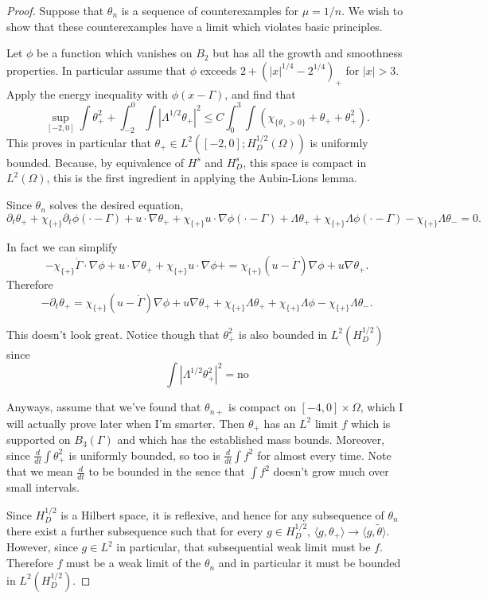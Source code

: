 \documentclass[11pt]{amsart}
\theoremstyle{remark}
\theoremstyle{definition}
\newcommand{\chevron}[1]{\langle #1 \rangle}
\newcommand{\paren}[1]{\left( #1 \right)}
\newcommand{\abs}[1]{\left\lvert #1 \right\rvert}
\newcommand{\del}{\partial}
\newcommand{\grad}{\nabla}
\newcommand{\ddt}{\frac{d}{dt}}
\newcommand{\indic}[1]{\chi_{\{#1\}}}
\begin{document}
\begin{proof}
Suppose that $\theta_n$ is a sequence of counterexamples for $\mu = 1/n$.  We wish to show that these counterexamples have a limit which violates basic principles.  

Let $\phi$ be a function which vanishes on $B_2$ but has all the growth and smoothness properties.  In particular assume that $\phi$ exceeds $2 + \paren{|x|^{1/4}-2^{1/4}}_+$ for $|x|>3$.  Apply the energy inequality with $\phi(x-\Gamma)$, and find that
\[ \sup_{[-2,0]} \int \theta_+^2 + \int_{-2}^0 \int \abs{\Lambda^{1/2}\theta_+}^2 \leq C \int_0^3 \int \paren{\indic{\theta_+>0} + \theta_+ + \theta_+^2}. \]
This proves in particular that $\theta_+ \in L^2([-2,0]; H_D^{1/2}(\Omega))$ is uniformly bounded.  Because, by equivalence of $H^s$ and $H^s_D$, this space is compact in $L^2(\Omega)$, this is the first ingredient in applying the Aubin-Lions lemma.  

Since $\theta_n$ solves the desired equation, 
\[ \del_t \theta_+ + \indic{+}\del_t \phi(\cdot-\Gamma) + u\cdot\grad\theta_+ + \indic{+}u\cdot\grad\phi(\cdot-\Gamma) + \Lambda \theta_+ + \indic{+} \Lambda\phi(\cdot-\Gamma) - \indic{+}\Lambda\theta_- = 0. \]

In fact we can simplify
\[ -\indic{+} \dot{\Gamma} \cdot\grad\phi + u\cdot\grad\theta_+ + \indic{+} u\cdot\grad\phi + = \indic{+} (u - \dot{\Gamma})\grad\phi + u\grad\theta_+. \]
Therefore
\[ -\del_t\theta_+ = \indic{+} (u - \dot{\Gamma})\grad\phi + u\grad\theta_+ + \indic{+}\Lambda \theta_+ + \indic{+}\Lambda\phi - \indic{+}\Lambda \theta_-. \]

This doesn't look great.  Notice though that $\theta_+^2$ is also bounded in $L^2(H_D^{1/2})$ since
\[ \int \abs{\Lambda^{1/2} \theta_+^2}^2 = \textrm{no} \]

Anyways, assume that we've found that $\theta_{n+}$ is compact on $[-4,0]\times\Omega$, which I will actually prove later when I'm smarter.  Then $\theta_+$ has an $L^2$ limit $f$ which is supported on $B_3(\Gamma)$ and which has the established mass bounds.  Moreover, since $\ddt \int \theta_+^2$ is uniformly bounded, so too is $\ddt \int f^2$ for almost every time.  Note that we mean $\ddt$ to be bounded in the sence that $\int f^2$ doesn't grow much over small intervals.  

Since $H_D^{1/2}$ is a Hilbert space, it is reflexive, and hence for any subsequence of $\theta_n$ there exist a further subsequence such that for every $g \in H_D^{1/2}$, $\chevron{g,\theta_+} \to \chevron{g,\tilde{\theta}}$.  However, since $g \in L^2$ in particular, that subsequential weak limit must be $f$.  Therefore $f$ must be a weak limit of the $\theta_n$ and in particular it must be bounded in $L^2(H_D^{1/2})$.  


\end{proof}
\end{document}
